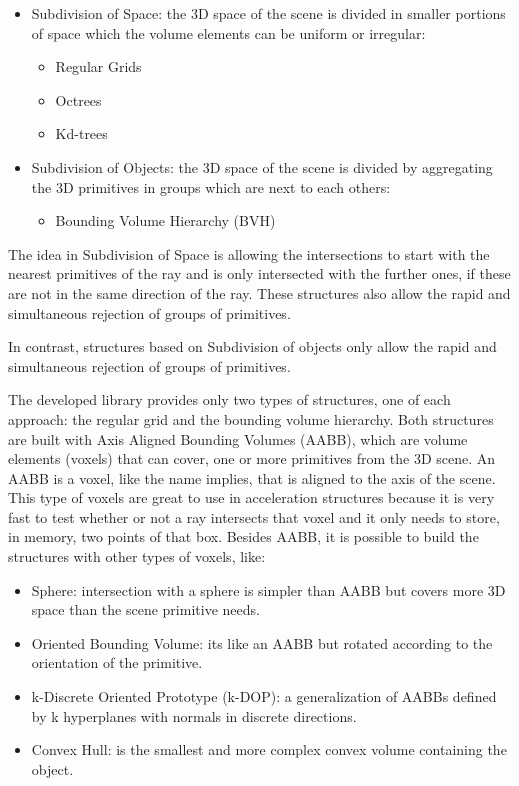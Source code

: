 \begin{itemize}
	\item Subdivision of Space: the 3D space of the scene is divided in smaller portions of space which the volume elements can be uniform or irregular:
	\begin{itemize}
		\item Regular Grids
		\item Octrees
		\item Kd-trees
	\end{itemize}
	\item Subdivision of Objects: the 3D space of the scene is divided by aggregating the 3D primitives in groups which are next to each others:
	\begin{itemize}
		\item Bounding Volume Hierarchy (BVH)
	\end{itemize}
\end{itemize}

\par
The idea in Subdivision of Space is allowing the intersections to start with the nearest primitives of the ray and is only intersected with the further ones, if these are not in the same direction of the ray.
These structures also allow the rapid and simultaneous rejection of groups of primitives.

\par
In contrast, structures based on Subdivision of objects only allow the rapid and simultaneous rejection of groups of primitives.

\par
The developed library provides only two types of structures, one of each approach: the regular grid and the bounding volume hierarchy.
Both structures are built with Axis Aligned Bounding Volumes (AABB), which are volume elements (voxels) that can cover, one or more primitives from the 3D scene.
An AABB is a voxel, like the name implies, that is aligned to the axis of the scene.
This type of voxels are great to use in acceleration structures because it is very fast to test whether or not a ray intersects that voxel and it only needs to store, in memory, two points of that box.
Besides AABB, it is possible to build the structures with other types of voxels, like:

\begin{itemize}
	\item Sphere: intersection with a sphere is simpler than AABB but covers more 3D space than the scene primitive needs.
	\item Oriented Bounding Volume: its like an AABB but rotated according to the orientation of the primitive.
	\item k-Discrete Oriented Prototype (k-DOP): a generalization of AABBs defined by k hyperplanes with normals in discrete directions.
	\item Convex Hull: is the smallest and more complex convex volume containing the object.
\end{itemize}

